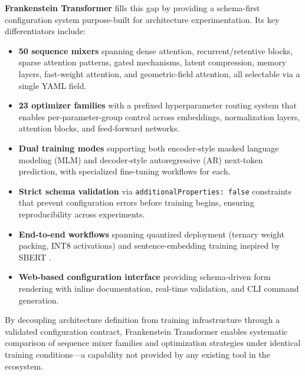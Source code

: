 \textbf{Frankenstein Transformer} fills this gap by providing a schema-first configuration system purpose-built for architecture experimentation. Its key differentiators include:

\begin{itemize}[leftmargin=*]
    \item \textbf{50 sequence mixers} spanning dense attention, recurrent/retentive blocks, sparse attention patterns, gated mechanisms, latent compression, memory layers, fast-weight attention, and geometric-field attention, all selectable via a single YAML field.
    \item \textbf{23 optimizer families} with a prefixed hyperparameter routing system that enables per-parameter-group control across embeddings, normalization layers, attention blocks, and feed-forward networks.
    \item \textbf{Dual training modes} supporting both encoder-style masked language modeling (MLM) and decoder-style autoregressive (AR) next-token prediction, with specialized fine-tuning workflows for each.
    \item \textbf{Strict schema validation} via \texttt{additionalProperties: false} constraints that prevent configuration errors before training begins, ensuring reproducibility across experiments.
    \item \textbf{End-to-end workflows} spanning quantized deployment (ternary weight packing, INT8 activations) and sentence-embedding training inspired by SBERT \citep{reimers_sentence-bert_2019}.
    \item \textbf{Web-based configuration interface} providing schema-driven form rendering with inline documentation, real-time validation, and CLI command generation.
\end{itemize}

By decoupling architecture definition from training infrastructure through a validated configuration contract, Frankenstein Transformer enables systematic comparison of sequence mixer families and optimization strategies under identical training conditions---a capability not provided by any existing tool in the ecosystem.
